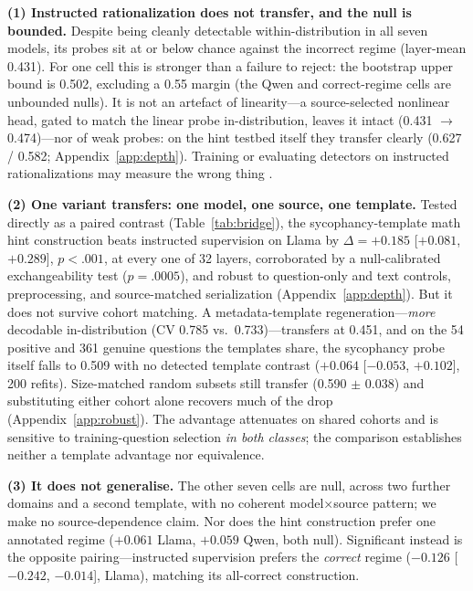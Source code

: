 \documentclass[11pt]{article}
\begin{document}
\textbf{(1) Instructed rationalization does not transfer, and the null is bounded.} Despite being cleanly detectable within-distribution in all seven models, its probes sit at or below chance against the incorrect regime (layer-mean 0.431). For one cell this is stronger than a failure to reject: the bootstrap upper bound is 0.502, excluding a 0.55 margin (the Qwen and correct-regime cells are unbounded nulls). It is not an artefact of linearity---a source-selected nonlinear head, gated to match the linear probe in-distribution, leaves it intact (0.431 $\to$ 0.474)---nor of weak probes: on the hint testbed itself they transfer clearly (0.627 / 0.582; Appendix~\ref{app:depth}). Training or evaluating detectors on instructed rationalizations may measure the wrong thing \citep[cf.][]{offpolicy2025probes}.

\textbf{(2) One variant transfers: one model, one source, one template.} Tested directly as a paired contrast (Table~\ref{tab:bridge}), the sycophancy-template math hint construction beats instructed supervision on Llama by $\Delta{=}{+}0.185$ [$+0.081$, $+0.289$], $p{<}.001$, at every one of 32 layers, corroborated by a null-calibrated exchangeability test ($p{=}.0005$), and robust to question-only and text controls, preprocessing, and source-matched serialization (Appendix~\ref{app:depth}). But it does not survive cohort matching. A metadata-template regeneration---\emph{more} decodable in-distribution (CV 0.785 vs.\ 0.733)---transfers at 0.451, and on the 54 positive and 361 genuine questions the templates share, the sycophancy probe itself falls to 0.509 with no detected template contrast ($+0.064$ [$-0.053$, $+0.102$], 200 refits). Size-matched random subsets still transfer (0.590 $\pm$ 0.038) and substituting either cohort alone recovers much of the drop (Appendix~\ref{app:robust}). The advantage attenuates on shared cohorts and is sensitive to training-question selection \emph{in both classes}; the comparison establishes neither a template advantage nor equivalence.

\textbf{(3) It does not generalise.} The other seven cells are null, across two further domains and a second template, with no coherent model$\times$source pattern; we make no source-dependence claim. Nor does the hint construction prefer one annotated regime ($+0.061$ Llama, $+0.059$ Qwen, both null). Significant instead is the opposite pairing---instructed supervision prefers the \emph{correct} regime ($-0.126$ [$-0.242$, $-0.014$], Llama), matching its all-correct construction.
\end{document}
